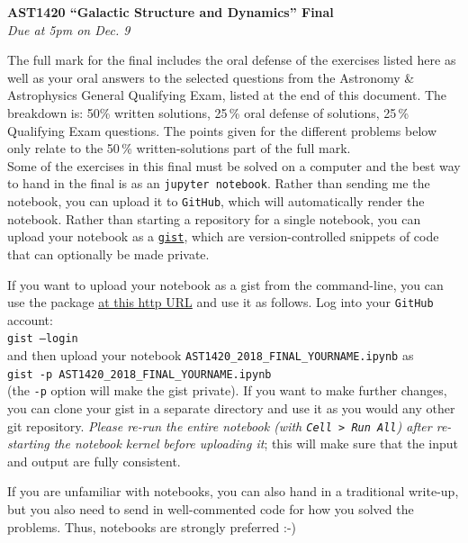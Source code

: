 \documentclass[12pt]{article}
\begin{document}
\begin{center}
{\bf \LARGE AST1420 ``Galactic Structure and Dynamics'' Final}\\[7pt]
\emph{Due at 5pm on Dec. 9}\\[7pt]
\end{center}

The full mark for the final includes the oral defense of the exercises
listed here as well as your oral answers to the selected questions
from the Astronomy \& Astrophysics General Qualifying Exam, listed at
the end of this document. The breakdown is: 50\% written solutions,
25\,\% oral defense of solutions, 25\,\% Qualifying Exam
questions. The points given for the different problems below only
relate to the 50\,\% written-solutions part of the full mark.\\

Some of the exercises in this final must be solved on a computer and
the best way to hand in the final is as an \texttt{jupyter
  notebook}. Rather than sending me the notebook, you can upload it to
\texttt{GitHub}, which will automatically render the notebook. Rather
than starting a repository for a single notebook, you can upload your
notebook as a \texttt{\href{https://gist.github.com/}{gist}}, which
are version-controlled snippets of code that can optionally be made
private.

If you want to upload your notebook as a gist from the command-line,
you can use the package \href{http://github.com/defunkt/gist}{at this
  http URL} and use it as follows. Log into your \texttt{GitHub}
account:\\

\texttt{gist --login}\\

and then upload your notebook
\texttt{AST1420\_2018\_FINAL\_YOURNAME.ipynb} as\\

\texttt{gist -p AST1420\_2018\_FINAL\_YOURNAME.ipynb}\\

(the \texttt{-p} option will make the gist private). If you want to
make further changes, you can clone your gist in a separate directory
and use it as you would any other git repository. \emph{Please re-run
  the entire notebook (with \texttt{Cell > Run All}) after re-starting
  the notebook kernel before uploading it}; this will make sure that
the input and output are fully consistent. 

If you are unfamiliar with notebooks, you can also hand in a
traditional write-up, but you also need to send in well-commented code
for how you solved the problems. Thus, notebooks are strongly
preferred :-)\\
\end{document}
